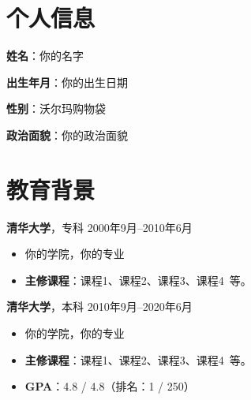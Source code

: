\documentclass[11pt]{article}
\newlength{\iconwidth}
\begin{document}
    \begin{minipage}[t]{0.78\textwidth}
        \begin{minipage}[t]{\textwidth}
        \section[个人信息]{\makebox[\iconwidth][c]{\color{primary_color}{\faAddressCard}}\quad 个人信息}
        \begin{minipage}[t]{0.5\textwidth}
            \textbf{姓\qquad 名}：你的名字
            
            \textbf{出生年月}：你的出生日期
        \end{minipage}
        \begin{minipage}[t]{0.35\textwidth}
            \textbf{性\qquad 别}：沃尔玛购物袋
            
            \textbf{政治面貌}：你的政治面貌
        \end{minipage}
        \vspace{1.2em}
        \end{minipage}

        \begin{minipage}[t]{\textwidth}
        \section[教育背景]{\makebox[\iconwidth][c]{\color{primary_color}{\faGraduationCap}}\quad 教育背景}
        
        {\large \textbf{清华大学}}，专科 \hfill 2000年9月--2010年6月
        \begin{itemize}
            \item 你的学院，你的专业
            \item \textbf{主修课程}：课程1、课程2、课程3、课程4\ 等。
        \end{itemize}
        
        \vspace{0.5em}
        {\large \textbf{清华大学}}，本科 \hfill 2010年9月--2020年6月
        \begin{itemize}
            \item 你的学院，你的专业
            \item \textbf{主修课程}：课程1、课程2、课程3、课程4\ 等。
            \item \textbf{GPA}：4.8 / 4.8（排名：1 / 250）
        \end{itemize}
        

\end{minipage}
\end{minipage}
\end{document}
